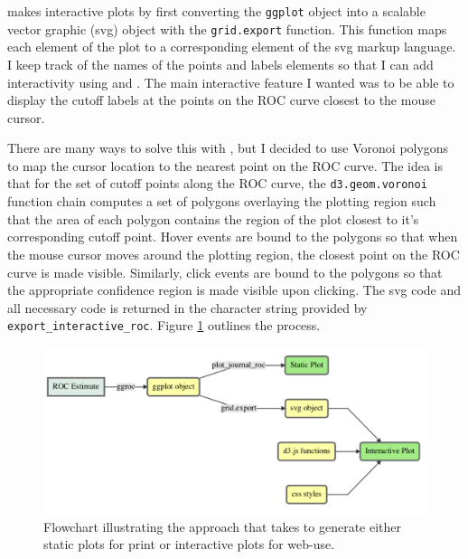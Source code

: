 \documentclass[article]{jss}
\begin{document}
 makes interactive plots by first converting the
\texttt{ggplot} object into a scalable vector graphic (svg) object with
the \texttt{grid.export} function. This function maps each element of
the plot to a corresponding element of the svg markup language. I keep
track of the names of the points and labels elements so that I can add
interactivity using  and . The main
interactive feature I wanted was to be able to display the cutoff labels
at the points on the ROC curve closest to the mouse cursor.

There are many ways to solve this with , but I decided to use
Voronoi polygons to map the cursor location to the nearest point on the
ROC curve. The idea is that for the set of cutoff points along the ROC
curve, the \texttt{d3.geom.voronoi} function chain computes a set of
polygons overlaying the plotting region such that the area of each
polygon contains the region of the plot closest to it's corresponding
cutoff point. Hover events are bound to the polygons so that when the
mouse cursor moves around the plotting region, the closest point on the
ROC curve is made visible. Similarly, click events are bound to the
polygons so that the appropriate confidence region is made visible upon
clicking. The svg code and all necessary  code is
returned in the character string provided by
\texttt{export\_interactive\_roc}. Figure \ref{flow} outlines the
 process.

\begin{figure}[ht]
\centering
\includegraphics{figure/diagram.pdf}
\caption{Flowchart illustrating the approach that  takes to generate either static plots for print or interactive plots for web-use. \label{flow}}
\end{figure}
\end{document}
